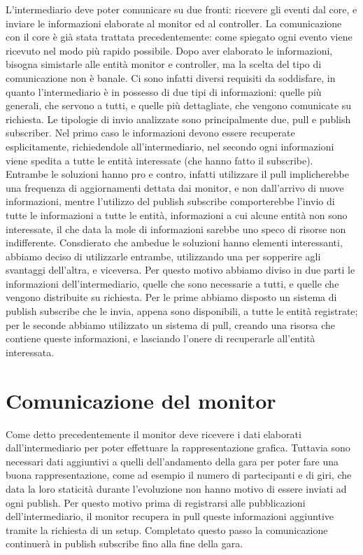 L’intermediario deve poter comunicare su due fronti: ricevere gli eventi dal core, e inviare le informazioni elaborate al monitor ed al controller.
La comunicazione con il core è già stata trattata precedentemente: come spiegato ogni evento viene ricevuto nel modo più rapido possibile.
Dopo aver elaborato le informazioni, bisogna simistarle alle entità monitor e controller, ma la scelta del tipo di comunicazione non è banale.
Ci sono infatti diversi requisiti da soddisfare, in quanto l’intermediario è in possesso di due tipi di informazioni: quelle più generali, che servono a tutti, e quelle più dettagliate, che vengono comunicate su richiesta.
Le tipologie di invio analizzate sono principalmente due, pull e publish subscriber. Nel primo caso le informazioni devono essere recuperate esplicitamente, richiedendole all’intermediario, nel secondo ogni informazioni viene spedita a tutte le entità interessate (che hanno fatto il subscribe).
Entrambe le soluzioni hanno pro e contro, infatti utilizzare il pull implicherebbe una frequenza di aggiornamenti dettata dai monitor, e non dall’arrivo di nuove informazioni, mentre l’utilizzo del publish subscribe comporterebbe l’invio di tutte le informazioni a tutte le entità, informazioni a cui alcune entità non sono interessate, il che data la mole di informazioni sarebbe uno speco di risorse non indifferente.
Consdierato che ambedue le soluzioni hanno elementi interessanti, abbiamo deciso di utilizzarle entrambe, utilizzando una per sopperire agli svantaggi dell’altra, e viceversa.
Per questo motivo abbiamo diviso in due parti le informazioni dell’intermediario, quelle che sono necessarie a tutti, e quelle che vengono distribuite su richiesta. Per le prime abbiamo disposto un sistema di publish subscribe che le invia, appena sono disponibili, a tutte le entità registrate; per le seconde abbiamo utilizzato un sistema di pull, creando una risorsa che contiene queste informazioni, e lasciando l’onere di recuperarle all’entità interessata.


\section{Comunicazione del monitor}

Come detto precedentemente il monitor deve ricevere i dati elaborati dall’intermediario per poter effettuare la rappresentazione grafica.
Tuttavia sono necessari dati aggiuntivi a quelli dell’andamento della gara per poter fare una buona rappresentazione, come ad esempio il numero di partecipanti e di giri, che data la loro staticità durante l’evoluzione non hanno motivo di essere inviati ad ogni publish. Per questo motivo prima di registrarsi alle pubblicazioni dell’intermediario, il monitor recupera in pull queste informazioni aggiuntive tramite la richiesta di un setup.
Completato questo passo la comunicazione continuerà in publish subscribe fino alla fine della gara.

